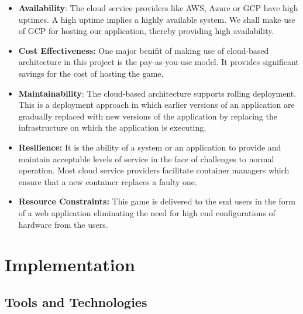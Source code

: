 \documentclass[oneside,12pt]{Classes/VTU}
\begin{document}
			\begin{itemize}
				\item \textbf{Availability}: The cloud service providers like AWS, Azure or GCP have high uptimes. A high uptime implies a highly available system. We shall make use of GCP for hosting our application, thereby providing high availability.  
				
				\item \textbf{Cost Effectiveness:} One major benifit of making use of cloud-based architecture in this project is the pay-as-you-use model. It provides significant savings for the cost of hosting the game. 
				
				\item \textbf{Maintainability}: The cloud-based architecture supports rolling deployment. This is a deployment approach in which earlier versions of an application are gradually replaced with new versions of the application by replacing the infrastructure on which the application is executing.
									
				\item \textbf{Resilience:} It is the ability of a system or an application to provide and maintain acceptable levels of service in the face of challenges to normal operation. Most cloud service providers facilitate container managers which ensure that a new container replaces a faulty one. 
				
				\item \textbf{Resource Constraints:} This game is delivered to the end users in the form of a web application eliminating the need for high end configurations of hardware from the users. 
			\end{itemize}
	
	\chapter{Implementation}
	\thispagestyle{fancy}
		\section{Tools and Technologies}
			\paragraph{}
			
\end{document}
